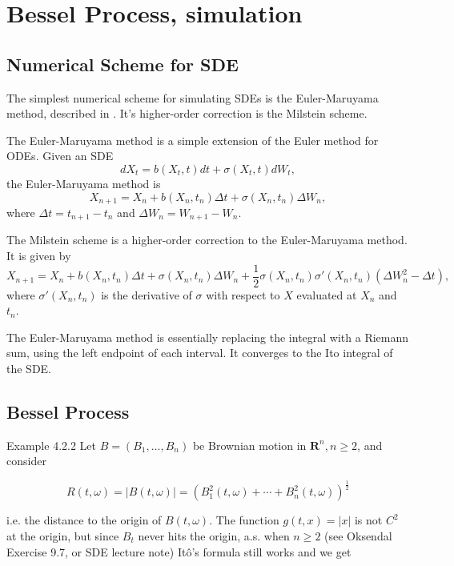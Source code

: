 
\section{Bessel Process, simulation}
\subsection{Numerical Scheme for SDE}

The simplest numerical scheme for simulating SDEs is the Euler-Maruyama method, described in \autocite[Chp.~9,10]{kloedenNumericalSolution1992}.
It's higher-order correction is the Milstein scheme.

The Euler-Maruyama method is a simple extension of the Euler method for ODEs.
Given an SDE
\begin{equation}
    dX_t = b(X_t, t) dt + \sigma(X_t, t) dW_t,
\end{equation}
the Euler-Maruyama method is
\begin{equation}
    X_{n+1} = X_n + b(X_n, t_n) \Delta t + \sigma(X_n, t_n) \Delta W_n,
\end{equation}
where $\Delta t = t_{n+1} - t_n$ and $\Delta W_n = W_{n+1} - W_n$.

The Milstein scheme is a higher-order correction to the Euler-Maruyama method.
It is given by
\begin{equation}
    X_{n+1} = X_n + b(X_n, t_n) \Delta t + \sigma(X_n, t_n) \Delta W_n + \frac{1}{2} \sigma(X_n, t_n) \sigma'(X_n, t_n) (\Delta W_n^2 - \Delta t),
\end{equation}
where $\sigma'(X_n, t_n)$ is the derivative of $\sigma$ with respect to $X$ evaluated at $X_n$ and $t_n$.

The Euler-Maruyama method is essentially replacing the integral with a Riemann sum, using the left endpoint of each interval. It converges to the Ito integral of the SDE.


\subsection{Bessel Process}

Example 4.2.2 Let $B=\left(B_1, \ldots, B_n\right)$ be Brownian motion in $\mathbf{R}^n, n \geq 2$, and consider

\[
R(t, \omega)=|B(t, \omega)|=\left(B_1^2(t, \omega)+\cdots+B_n^2(t, \omega)\right)^{\frac{1}{2}}
\]

i.e. the distance to the origin of $B(t, \omega)$. The function $g(t, x)=|x|$ is not $C^2$ at the origin, but since $B_t$ never hits the origin, a.s. when $n \geq 2$ (see Oksendal Exercise 9.7, or SDE lecture note) Itô's formula still works and we get

